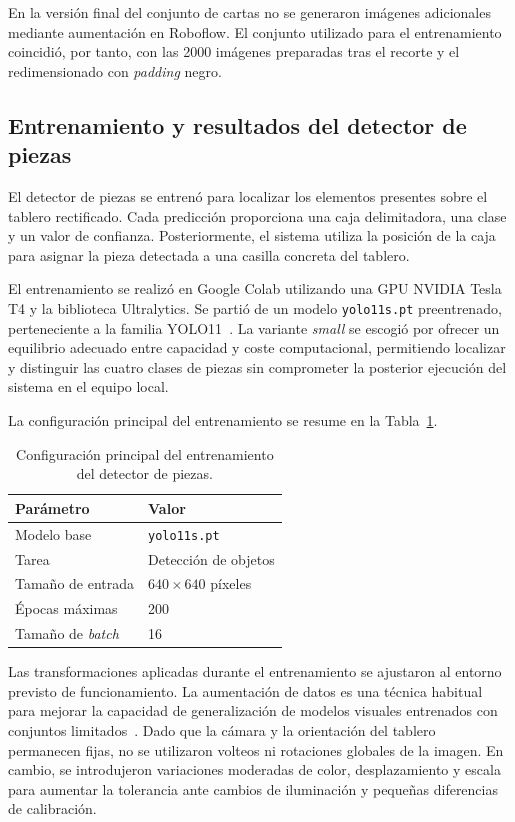 En la versión final del conjunto de cartas no se generaron imágenes adicionales mediante aumentación en Roboflow. El conjunto utilizado para el entrenamiento coincidió, por tanto, con las 2000 imágenes preparadas tras el recorte y el redimensionado con \textit{padding} negro.


\subsection{Entrenamiento y resultados del detector de piezas}
\label{subsec:entrenamiento-detector-piezas}

El detector de piezas se entrenó para localizar los elementos presentes sobre el tablero rectificado. Cada predicción proporciona una caja delimitadora, una clase y un valor de confianza. Posteriormente, el sistema utiliza la posición de la caja para asignar la pieza detectada a una casilla concreta del tablero.

El entrenamiento se realizó en Google Colab utilizando una GPU NVIDIA Tesla T4 y la biblioteca Ultralytics. Se partió de un modelo \texttt{yolo11s.pt} preentrenado, perteneciente a la familia YOLO11~\cite{ultralytics_yolo11}. La variante \textit{small} se escogió por ofrecer un equilibrio adecuado entre capacidad y coste computacional, permitiendo localizar y distinguir las cuatro clases de piezas sin comprometer la posterior ejecución del sistema en el equipo local.

La configuración principal del entrenamiento se resume en la Tabla~\ref{tab:config-entrenamiento-piezas}.

\begin{table}[H]
\centering
\small
\begin{tabular}{l l}
\hline
\textbf{Parámetro} & \textbf{Valor} \\
\hline
Modelo base & \texttt{yolo11s.pt} \\
Tarea & Detección de objetos \\
Tamaño de entrada & $640\times640$ píxeles \\
Épocas máximas & 200 \\
Tamaño de \textit{batch} & 16 \\
\hline
\end{tabular}
\caption{Configuración principal del entrenamiento del detector de piezas.}
\label{tab:config-entrenamiento-piezas}
\end{table}

Las transformaciones aplicadas durante el entrenamiento se ajustaron al entorno previsto de funcionamiento. La aumentación de datos es una técnica habitual para mejorar la capacidad de generalización de modelos visuales entrenados con conjuntos limitados~\cite{shorten2019augmentation}. Dado que la cámara y la orientación del tablero permanecen fijas, no se utilizaron volteos ni rotaciones globales de la imagen. En cambio, se introdujeron variaciones moderadas de color, desplazamiento y escala para aumentar la tolerancia ante cambios de iluminación y pequeñas diferencias de calibración.

